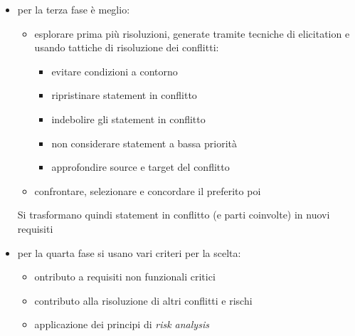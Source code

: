 \documentclass[a4paper,12pt, oneside]{book}
\begin{document}
\begin{itemize}
  \item per la terza fase è meglio:
  \begin{itemize}
    \item esplorare prima più risoluzioni, generate tramite tecniche di
    elicitation e usando tattiche di risoluzione dei conflitti:
    \begin{itemize}
      \item evitare condizioni a contorno
      \item ripristinare statement in conflitto
      \item indebolire gli statement in conflitto
      \item non considerare statement a bassa priorità
      \item approfondire source e target del conflitto
    \end{itemize}
    \item confrontare, selezionare e concordare il preferito poi
  \end{itemize}
  Si trasformano quindi statement in conflitto (e parti coinvolte) in nuovi
  requisiti 
  \item per la quarta fase si usano vari criteri per la scelta:
  \begin{itemize}
    \item ontributo a requisiti non funzionali critici 
    \item contributo alla risoluzione di altri conflitti e rischi 
    \item applicazione dei principi di \textit{risk analysis}
  \end{itemize}
\end{itemize}
\end{document}

